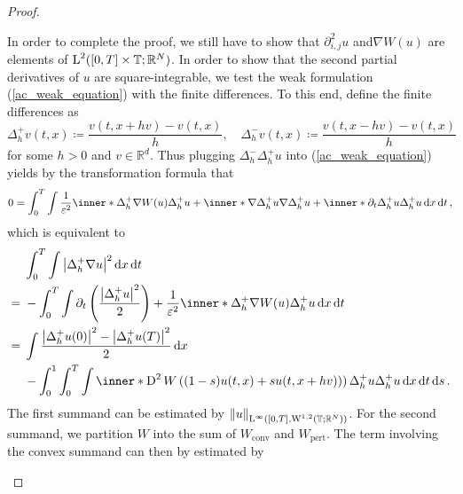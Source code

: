 \begin{proof}
\begin{description}[wide=0pt]
		In order to complete the proof, we still have to show that $ \partial_{ i , j }^{ 2 } u$ and$ \nabla W ( u) $ are elements of $ \operatorname{L}^{ 2 } ( [ 0 , T ] \times \operatorname{\mathbb{T}} ; \mathbb{ R }^{ N } ) $.
		In order to show that the second partial derivatives of $ u $ are square-integrable, we test the weak formulation (\ref{ac_weak_equation}) with the finite differences. To this end, define the finite differences as
		\begin{equation*}
			\Delta_{ h }^{ + } v ( t , x ) \coloneqq \frac{ v ( t , x + h v ) - v ( t , x ) }{ h },
			\quad
			\Delta_{ h }^{ - } v ( t , x ) \coloneqq \frac{ v ( t , x - h v ) - v ( t , x ) }{ h }
		\end{equation*}
		for some $ h > 0 $ and $ v \in \mathbb{ R }^{ d } $. Thus plugging $ \Delta_{ h }^{ - } \Delta_{ h }^{ + } u $ into (\ref{ac_weak_equation}) yields by the transformation formula that
		\begin{equation*}
			0
			=
			\int_{ 0 }^{ T }
			\int
			\frac{ 1 }{ \varepsilon^{ 2 } }
			\inner*{ \Delta_{ h }^{ + } \nabla W ( u ) }{ \Delta_{ h }^{ + } u }
			+
			\inner*{ \nabla \Delta_{ h }^{ + } u }{ \nabla \Delta_{ h }^{ + } u }
			+
			\inner*{ \partial_{ t } \Delta_{ h }^{ + } u }{ \Delta_{ h }^{ + } u }
			\dd{ x }
			\dd{ t },
		\end{equation*}
		which is equivalent to
		\begin{align*}
			& \int_{ 0 }^{ T }
			\int
			\abs{ \Delta_{ h }^{ + } \nabla u }^{ 2 }
			\dd{ x }
			\dd{ t }
			\\
			={} &
			-
			\int_{ 0 }^{ T }
			\int
			\partial_{ t } \left( \frac{ \abs{ \Delta_{ h }^{ + } u }^{ 2 } }{ 2 } \right)
			+
			\frac{ 1 }{ \varepsilon^{ 2 } }
			\inner*{ \Delta_{ h }^{ + } \nabla W ( u ) }{ \Delta_{ h }^{ + } u }
			\dd{ x }
			\dd{ t }
			\\
			={} &
			\int  
			\frac{ \abs{ \Delta_{ h }^{ + } u ( 0 ) }^{ 2 } - \abs{ \Delta_{ h }^{ + } u ( T ) }^{ 2 } }{ 2 }
			\dd{ x }
			\\
			& -
			\int_{ 0 }^{ 1 }
			\int_{ 0 }^{ T }
			\int
			\inner*{ 
				\diff^{ 2 } W \left( ( 1 - s ) u ( t, x  ) + s u( t,  x + h v ) ) \right) 
				\Delta_{ h }^{ + } u
			}{
				\Delta_{ h }^{ + } u 
			}
			\dd{ x }
			\dd{ t }
			\dd{ s }.
		\end{align*}
		The first summand can be estimated by $ \norm{ u }_{ \operatorname{L}^{ \infty } ( [0 , T ] , \operatorname{W}^{ 1 , 2 } ( \operatorname{\mathbb{T}} ; \mathbb{ R }^{ N } ) ) } $. For the second summand, we partition $ W $ into the sum of $ W_{ \mathrm{conv} } $ and $ W_{ \mathrm{pert} } $. The term involving the convex summand can then by estimated by

\end{description}
\end{proof}
